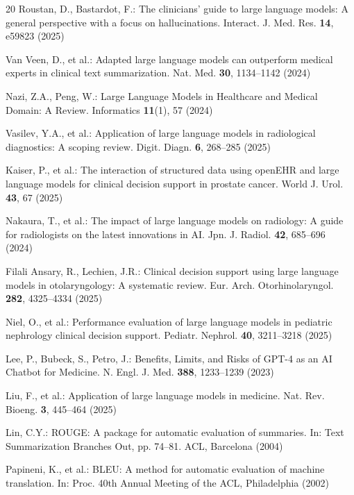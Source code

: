 \documentclass[runningheads]{llncs}
\begin{document}
\begin{thebibliography}{20}
Roustan, D., Bastardot, F.: The clinicians' guide to large language models: A general perspective with a focus on hallucinations. Interact. J. Med. Res. \textbf{14}, e59823 (2025)

Van Veen, D., et al.: Adapted large language models can outperform medical experts in clinical text summarization. Nat. Med. \textbf{30}, 1134--1142 (2024)

Nazi, Z.A., Peng, W.: Large Language Models in Healthcare and Medical Domain: A Review. Informatics \textbf{11}(1), 57 (2024)

Vasilev, Y.A., et al.: Application of large language models in radiological diagnostics: A scoping review. Digit. Diagn. \textbf{6}, 268--285 (2025)

Kaiser, P., et al.: The interaction of structured data using openEHR and large language models for clinical decision support in prostate cancer. World J. Urol. \textbf{43}, 67 (2025)

Nakaura, T., et al.: The impact of large language models on radiology: A guide for radiologists on the latest innovations in AI. Jpn. J. Radiol. \textbf{42}, 685--696 (2024)

Filali Ansary, R., Lechien, J.R.: Clinical decision support using large language models in otolaryngology: A systematic review. Eur. Arch. Otorhinolaryngol. \textbf{282}, 4325--4334 (2025)

Niel, O., et al.: Performance evaluation of large language models in pediatric nephrology clinical decision support. Pediatr. Nephrol. \textbf{40}, 3211--3218 (2025)

Lee, P., Bubeck, S., Petro, J.: Benefits, Limits, and Risks of GPT-4 as an AI Chatbot for Medicine. N. Engl. J. Med. \textbf{388}, 1233--1239 (2023)

Liu, F., et al.: Application of large language models in medicine. Nat. Rev. Bioeng. \textbf{3}, 445--464 (2025)

Lin, C.Y.: ROUGE: A package for automatic evaluation of summaries. In: Text Summarization Branches Out, pp. 74--81. ACL, Barcelona (2004)

Papineni, K., et al.: BLEU: A method for automatic evaluation of machine translation. In: Proc. 40th Annual Meeting of the ACL, Philadelphia (2002)


\end{thebibliography}
\end{document}

